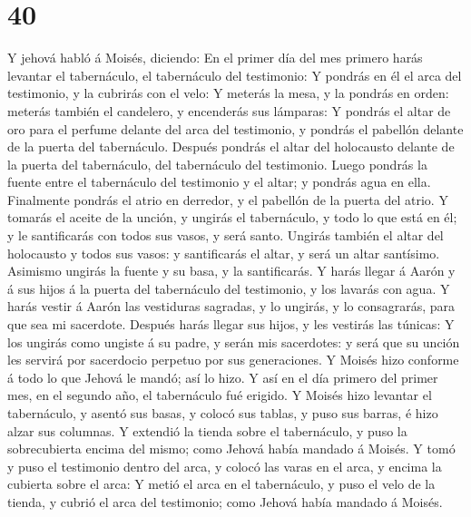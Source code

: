 \hypertarget{section-39}{%
\section{40}\label{section-39}}

 Y jehová habló á Moisés, diciendo:  En el
primer día del mes primero harás levantar el tabernáculo, el tabernáculo
del testimonio:  Y pondrás en él el arca del testimonio, y
la cubrirás con el velo:  Y meterás la mesa, y la pondrás en
orden: meterás también el candelero, y encenderás sus lámparas:
 Y pondrás el altar de oro para el perfume delante del arca
del testimonio, y pondrás el pabellón delante de la puerta del
tabernáculo.  Después pondrás el altar del holocausto
delante de la puerta del tabernáculo, del tabernáculo del testimonio.
 Luego pondrás la fuente entre el tabernáculo del testimonio
y el altar; y pondrás agua en ella.  Finalmente pondrás el
atrio en derredor, y el pabellón de la puerta del atrio.  Y
tomarás el aceite de la unción, y ungirás el tabernáculo, y todo lo que
está en él; y le santificarás con todos sus vasos, y será santo.
 Ungirás también el altar del holocausto y todos sus vasos:
y santificarás el altar, y será un altar santísimo. 
Asimismo ungirás la fuente y su basa, y la santificarás.  Y
harás llegar á Aarón y á sus hijos á la puerta del tabernáculo del
testimonio, y los lavarás con agua.  Y harás vestir á Aarón
las vestiduras sagradas, y lo ungirás, y lo consagrarás, para que sea mi
sacerdote.  Después harás llegar sus hijos, y les vestirás
las túnicas:  Y los ungirás como ungiste á su padre, y
serán mis sacerdotes: y será que su unción les servirá por sacerdocio
perpetuo por sus generaciones.  Y Moisés hizo conforme á
todo lo que Jehová le mandó; así lo hizo.  Y así en el día
primero del primer mes, en el segundo año, el tabernáculo fué erigido.
 Y Moisés hizo levantar el tabernáculo, y asentó sus basas,
y colocó sus tablas, y puso sus barras, é hizo alzar sus columnas.
 Y extendió la tienda sobre el tabernáculo, y puso la
sobrecubierta encima del mismo; como Jehová había mandado á Moisés.
 Y tomó y puso el testimonio dentro del arca, y colocó las
varas en el arca, y encima la cubierta sobre el arca:  Y
metió el arca en el tabernáculo, y puso el velo de la tienda, y cubrió
el arca del testimonio; como Jehová había mandado á Moisés.
